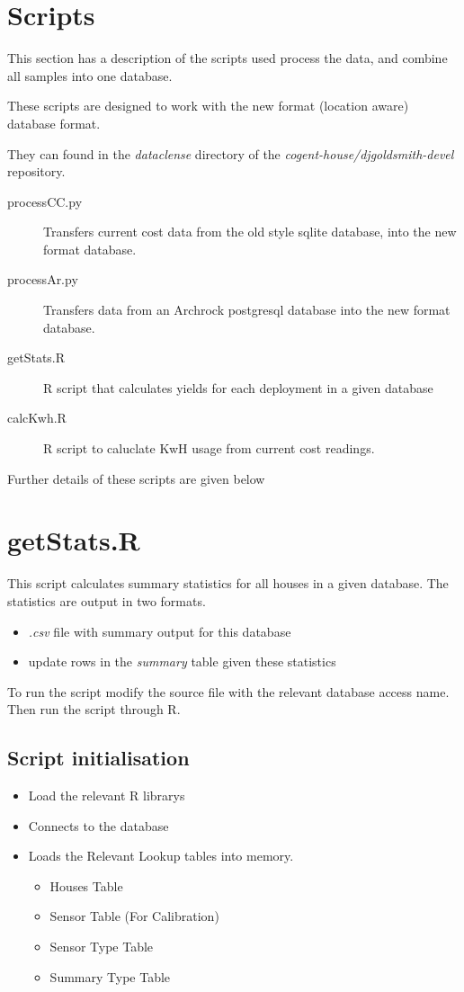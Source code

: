 \documentclass[10pt,a4paper]{article}\usepackage{graphicx, color}
\begin{document}
\section{Scripts}
This section has a description of the scripts used process the data, and combine
all samples into one database.

These scripts are designed to work with the new format (location aware) database format.

They can found in the \emph{dataclense} directory of the \emph{cogent-house/djgoldsmith-devel} repository.

\begin{description}
    \item[processCC.py]  Transfers current cost data from the old style sqlite
      database, into the new format database.
    \item[processAr.py] Transfers data from an Archrock postgresql database into the
      new format database.
    \item[getStats.R] R script that calculates yields for each deployment in a given database
    \item[calcKwh.R] R script to caluclate KwH usage from current cost readings.
\end{description}

Further details of these scripts are given below

\section{getStats.R}




This script calculates summary statistics for all houses in a given database.
The statistics are output in two formats.
\begin{itemize}
  \item \emph{.csv} file with summary output for this database
  \item update rows in the \emph{summary} table given these statistics
\end{itemize}

To run the script modify the source file with the relevant database access
name. Then run the script through R. 


\subsection{Script initialisation}

\begin{itemize}
\item Load the relevant R librarys
\item Connects to the database
\item Loads the Relevant Lookup tables into memory.
  \begin{itemize}
  \item Houses Table
  \item Sensor Table (For Calibration)
  \item Sensor Type Table
  \item Summary Type Table
  \end{itemize}
\end{itemize}
\end{document}
